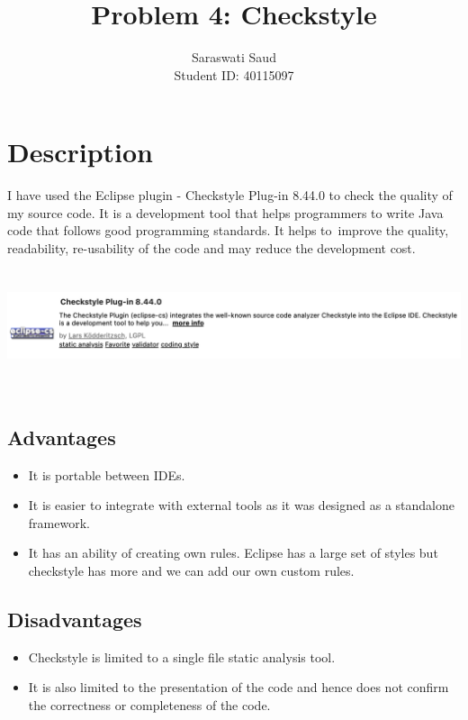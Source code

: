 \documentclass[a4paper,12pt]{article}
\title{Problem 4: Checkstyle}
\author{Saraswati Saud \\
Student ID: 40115097}
\date{}
\begin{document}
\maketitle
\section{Description}
    I have used the Eclipse plugin - Checkstyle Plug-in 8.44.0 to check the quality of my source code. It is a development tool that helps programmers to write Java code that follows good programming standards. It helps to improve the quality, readability, re-usability of the code and may reduce the development cost.\\
    \includegraphics[width=16cm, height=4cm]{check_style.png}
    \subsection{Advantages}
    \begin{itemize}
        \item It is portable between IDEs.
        \item It is easier to integrate with external tools as it was designed as a standalone framework.
        \item It has an ability of creating own rules. Eclipse has a large set of styles but checkstyle has more and we can add our own custom rules.
    \end{itemize}
    
    \subsection{Disadvantages}
    \begin{itemize}
        \item Checkstyle is limited to a single file static analysis tool.
        \item It is also limited to the presentation of the code and hence does not confirm the correctness or completeness of the code.
    \end{itemize}
\end{document}
